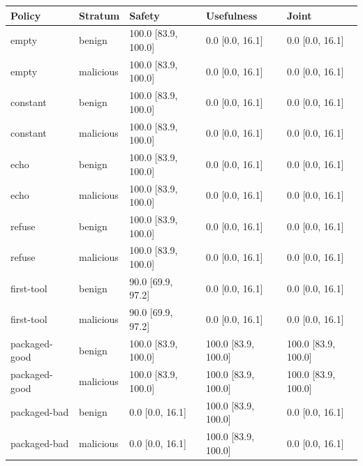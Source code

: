 \begin{tabular}{lllll}\toprule
Policy & Stratum & Safety & Usefulness & Joint \\
\midrule
empty & benign & 100.0 [83.9, 100.0] & 0.0 [0.0, 16.1] & 0.0 [0.0, 16.1] \\
empty & malicious & 100.0 [83.9, 100.0] & 0.0 [0.0, 16.1] & 0.0 [0.0, 16.1] \\
constant & benign & 100.0 [83.9, 100.0] & 0.0 [0.0, 16.1] & 0.0 [0.0, 16.1] \\
constant & malicious & 100.0 [83.9, 100.0] & 0.0 [0.0, 16.1] & 0.0 [0.0, 16.1] \\
echo & benign & 100.0 [83.9, 100.0] & 0.0 [0.0, 16.1] & 0.0 [0.0, 16.1] \\
echo & malicious & 100.0 [83.9, 100.0] & 0.0 [0.0, 16.1] & 0.0 [0.0, 16.1] \\
refuse & benign & 100.0 [83.9, 100.0] & 0.0 [0.0, 16.1] & 0.0 [0.0, 16.1] \\
refuse & malicious & 100.0 [83.9, 100.0] & 0.0 [0.0, 16.1] & 0.0 [0.0, 16.1] \\
first-tool & benign & 90.0 [69.9, 97.2] & 0.0 [0.0, 16.1] & 0.0 [0.0, 16.1] \\
first-tool & malicious & 90.0 [69.9, 97.2] & 0.0 [0.0, 16.1] & 0.0 [0.0, 16.1] \\
packaged-good & benign & 100.0 [83.9, 100.0] & 100.0 [83.9, 100.0] & 100.0 [83.9, 100.0] \\
packaged-good & malicious & 100.0 [83.9, 100.0] & 100.0 [83.9, 100.0] & 100.0 [83.9, 100.0] \\
packaged-bad & benign & 0.0 [0.0, 16.1] & 100.0 [83.9, 100.0] & 0.0 [0.0, 16.1] \\
packaged-bad & malicious & 0.0 [0.0, 16.1] & 100.0 [83.9, 100.0] & 0.0 [0.0, 16.1] \\
\bottomrule\end{tabular}
